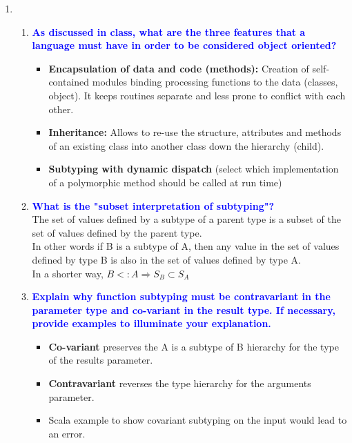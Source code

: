 \documentclass[10pt]{article}
\begin{document}
\begin{enumerate}
    
    \item
    \begin{enumerate}
        \item \textbf{\textcolor{blue}{As discussed in class, what are the three features that a language must have in order to be considered object oriented?}}
            \begin{itemize}
                \item \textbf{Encapsulation of data and code (methods):} Creation of self-contained modules binding processing functions to the data (classes, object). It keeps routines separate and less prone to conflict with each other.
                \item \textbf{Inheritance:} Allows to re-use the structure, attributes and methods of an existing class into another class down the hierarchy (child).
                \item \textbf{Subtyping with dynamic dispatch} (select which implementation of a polymorphic method should be called at run time) 
            \end{itemize}
        \item \textbf{\textcolor{blue}{What is the "subset interpretation of subtyping"?}}
            \\ The set of values defined by a subtype of a parent type is a subset of the set of values defined by the parent type. 
            \\ In other words if B is a subtype of A, then any value in the set of values defined by type B is also in the set of values defined by type A.
            \\ In a shorter way, $B <: A \Rightarrow S_B \subset S_A$
        \item \textbf{\textcolor{blue}{Explain why function subtyping must be contravariant in the parameter type and co-variant in the result type. If necessary, provide examples to illuminate your explanation.}}
            \begin{itemize}
                \item \textbf{Co-variant} preserves the A is a subtype of B hierarchy for the type of the results parameter.
                \item \textbf{Contravariant} reverses the type hierarchy for the arguments parameter.
            \end{itemize}
            \begin{itemize}
                \item Scala example to show covariant subtyping on the input would lead to an error.

\end{itemize}
\end{enumerate}
\end{enumerate}
\end{document}
